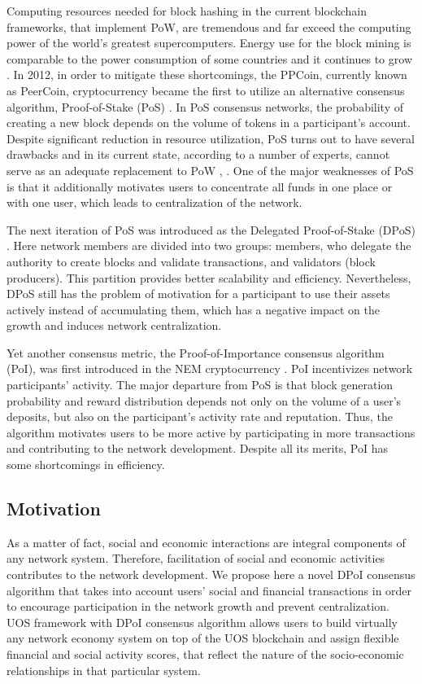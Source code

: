 \documentclass[a4paper,12pt]{article}
\begin{document}
Computing resources needed for block hashing in the current blockchain frameworks, that implement PoW, are tremendous and far exceed the computing power of the world’s greatest supercomputers. Energy use for the block mining is comparable to the power consumption of some countries and it continues to grow \cite{energy}. In 2012, in order to mitigate these shortcomings, the PPCoin, currently  known as PeerCoin, cryptocurrency became the first to utilize an alternative consensus algorithm, Proof-of-Stake (PoS) \cite{Ppcoin}. In PoS consensus networks, the probability of creating a new block depends on the volume of tokens in a participant’s account. Despite significant reduction in resource utilization, PoS turns out to have several drawbacks and in its current state, according to a number of experts, cannot serve as an adequate replacement to PoW \cite{Demeester}, \cite{Poelstra}. One of the major weaknesses of PoS is that it additionally motivates users to concentrate all funds in one place or with one user, which leads to centralization of the network.

The next iteration of PoS was introduced as the Delegated Proof-of-Stake (DPoS) \cite{dantheman}. Here network members are divided into two groups: members, who delegate the authority to create blocks and validate transactions, and validators (block producers). This partition provides better scalability and efficiency. Nevertheless, DPoS still has the problem of motivation for a participant to use their assets actively instead of accumulating them, which has a negative impact on the growth and induces network centralization. 

Yet another consensus metric, the Proof-of-Importance consensus algorithm (PoI), was first introduced in the NEM cryptocurrency \cite{nem}. PoI incentivizes network participants' activity. The major departure from PoS is that block generation probability and reward distribution depends not only on the volume of a user's deposits, but also on the participant's activity rate and reputation. Thus, the algorithm motivates users to be more active by participating in more transactions and contributing to the network development. Despite all its merits, PoI has some shortcomings in efficiency. 


\subsection{Motivation}
As a matter of fact, social and economic interactions are integral components of any network system. Therefore, facilitation of social and economic activities contributes to the network development. We propose here a novel DPoI consensus algorithm that takes into account users' social and financial transactions in order to encourage participation in the network growth and prevent centralization. U{\degree}OS framework with DPoI consensus algorithm allows users to build virtually any network economy system on top of the U{\degree}OS blockchain and assign flexible financial and social activity scores, that reflect the nature of the socio-economic relationships in that particular system. 
\end{document}

